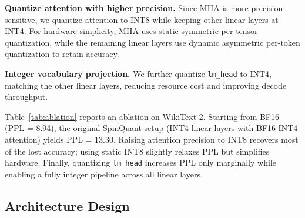 \documentclass[conference]{IEEEtran}
\begin{document}
\textbf{Quantize attention with higher precision.}  
Since MHA is more precision-sensitive, we quantize attention to INT8 while keeping other linear layers at INT4. For hardware simplicity, MHA uses static symmetric per-tensor quantization, while the remaining linear layers use dynamic asymmetric per-token quantization to retain accuracy. 

\textbf{Integer vocabulary projection.}  
We further quantize \texttt{lm\_head} to INT4, matching the other linear layers, reducing resource cost and improving decode throughput.

Table~\ref{tab:ablation} reports an ablation on WikiText-2. Starting from BF16 (PPL = 8.94), the original SpinQuant setup (INT4 linear layers with BF16-INT4 attention) yields PPL = 13.30. Raising attention precision to INT8 recovers most of the lost accuracy; using static INT8 slightly relaxes PPL but simplifies hardware. Finally, quantizing \texttt{lm\_head} increases PPL only marginally while enabling a fully integer pipeline across all linear layers.


\subsection{Architecture Design}


\end{document}

